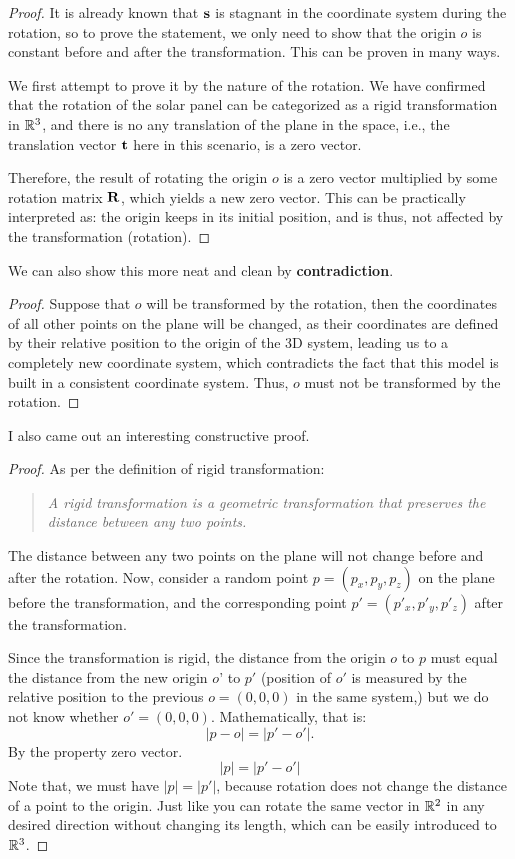 \documentclass[12pt,a4paper]{article}
\begin{document}
\begin{solution}
\begin{remark}
\begin{proof}
    It is already known that $\mathbf{s}$ is stagnant in the coordinate system during the rotation, so to prove the statement, we only need to show that the origin $o$ is constant before and after the transformation. This can be proven in many ways.

    We first attempt to prove it by the nature of the rotation. We have confirmed that the rotation of the solar panel can be categorized as a rigid transformation in $\mathbb{R}^3$, and there is no any translation of the plane in the space, i.e., the translation vector $\mathbf{t}$ here in this scenario, is a zero vector. 
    
    Therefore, the result of rotating the origin $o$ is a zero vector multiplied by some rotation matrix $\mathbf{R}$, which yields a new zero vector. This can be practically interpreted as: the origin keeps in its initial position, and is thus, not affected by the transformation (rotation).
    \end{proof}
    We can also show this more neat and clean by \textbf{contradiction}. 
    
   \begin{proof}
    Suppose that $o$ will be transformed by the rotation, then the coordinates of all other points on the plane will be changed, as their coordinates are defined by their relative position to the origin of the 3D system, leading us to a completely new coordinate system, which contradicts the fact that this model is built in a consistent coordinate system. Thus, $o$ must not be transformed by the rotation.
   \end{proof}
   
I also came out an interesting constructive proof.

\begin{proof}
    As per the definition of rigid transformation:
    \begin{quote}
        \textit{A rigid transformation is a geometric transformation that preserves the distance between any two points.}
    \end{quote}
    The distance between any two points on the plane will not change before and after the rotation. Now, consider a random point ${p}=(p_x,p_y,p_z)$ on the plane before the transformation, and the corresponding point ${p'} = (p'_x,p'_y,p'_z)$ after the transformation.

    Since the transformation is rigid, the distance from the origin $o$ to ${p}$ must equal the distance from the new origin $o’$ to ${p'}$ (position of $o'$ is measured by the relative position to the previous $o = (0,0,0)$ in the same system,) but we do not know whether $o' = (0,0,0)$. Mathematically, that is:
    \[
    |{p} - o| = |{p'} - o'|.
    \]
    By the property zero vector.
    \[
    |p| = |p'- o'|
    \]
    Note that, we must have $|p| = |p'|$, because rotation does not change the distance of a point to the origin. Just like you can rotate the same vector in $\mathbb{R}^2$ in any desired direction without changing its length, which can be easily introduced to $\mathbb{R}^3$.


\end{proof}
\end{remark}
\end{solution}
\end{document}
